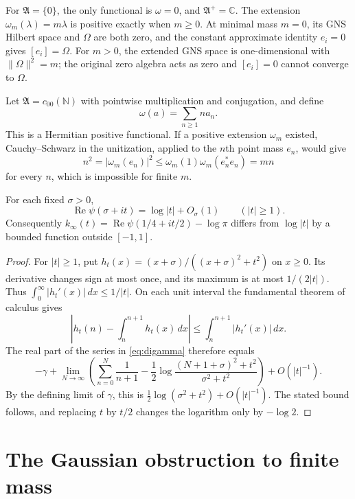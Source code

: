 \documentclass[11pt]{article}
\numberwithin{equation}{section}
\newcommand{\C}{\mathbb C}
\begin{document}
For $\mathfrak A=\{0\}$, the only functional is $\omega=0$, and
$\mathfrak A^+=\C$.  The extension $\omega_m(\lambda)=m\lambda$
is positive exactly when $m\geq0$.
At minimal mass $m=0$, its GNS Hilbert space and $\Omega$ are both zero,
and the constant approximate identity $e_i=0$ gives $[e_i]=\Omega$.
For $m>0$, the extended GNS space is one-dimensional with
$\|\Omega\|^2=m$; the original zero algebra acts as zero and
$[e_i]=0$ cannot converge to $\Omega$.

\begin{example}
Let $\mathfrak A=c_{00}(\mathbb N)$ with pointwise multiplication and
conjugation, and define
\[
 \omega(a)=\sum_{n\geq1}n a_n.
\]
This is a Hermitian positive functional.  If a positive extension
$\omega_m$ existed, Cauchy--Schwarz in the unitization, applied to the
$n$th point mass $e_n$, would give
\[
 n^2=|\omega_m(e_n)|^2
 \leq\omega_m(1)\omega_m(e_n^*e_n)=mn
\]
for every $n$, which is impossible for finite $m$.
\end{example}


\begin{lemma}
\label{lem:gamma-log-size}
For each fixed $\sigma>0$,
\[
 \operatorname{Re}\psi(\sigma+it)=\log|t|+O_\sigma(1)
 \qquad(|t|\geq1).
\]
Consequently $k_\infty(t)=\operatorname{Re}\psi(1/4+it/2)-\log\pi$
differs from $\log|t|$ by a bounded function outside $[-1,1]$.
\end{lemma}

\begin{proof}
For $|t|\geq1$, put
$h_t(x)=(x+\sigma)/((x+\sigma)^2+t^2)$ on $x\geq0$.
Its derivative changes sign at most once, and its maximum is at most
$1/(2|t|)$.  Thus $\int_0^\infty|h_t'(x)|\,dx\leq1/|t|$.
On each unit interval the fundamental theorem of calculus gives
\[
 \left|h_t(n)-\int_n^{n+1}h_t(x)\,dx\right|
 \leq\int_n^{n+1}|h_t'(x)|\,dx.
\]
The real part of the series in \eqref{eq:digamma} therefore equals
\[
 -\gamma+\lim_{N\to\infty}
 \left(\sum_{n=0}^N\frac1{n+1}
 -\frac12\log\frac{(N+1+\sigma)^2+t^2}{\sigma^2+t^2}\right)
 +O(|t|^{-1}).
\]
By the defining limit of $\gamma$, this is
$\tfrac12\log(\sigma^2+t^2)+O(|t|^{-1})$.
The stated bound follows, and replacing $t$ by $t/2$ changes the logarithm
only by $-\log2$.
\end{proof}

\section{The Gaussian obstruction to finite mass}
\label{sec:weil-mass}
\end{document}
